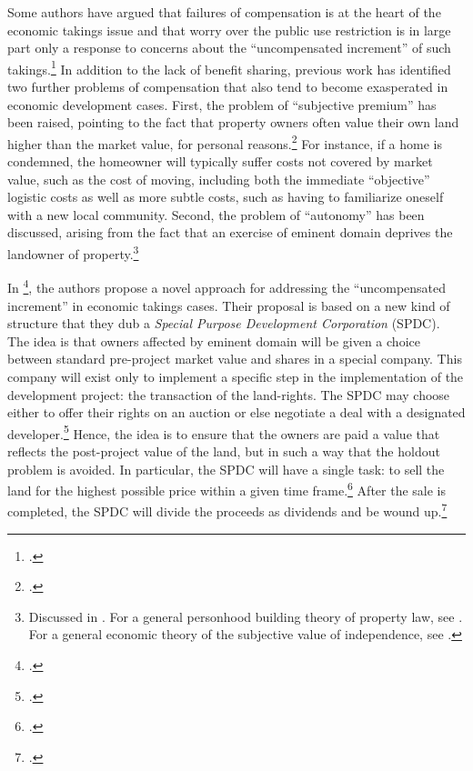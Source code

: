 {Some authors have argued that failures of compensation is at the heart of the economic takings issue and that worry over the public use restriction is in large part only a response to concerns about the ``uncompensated increment'' of such takings.\footcite[See][962]{fennell04} In addition to the lack of benefit sharing, previous work has identified two further problems of compensation that also tend to become exasperated in economic development cases. First, the problem of ``subjective premium'' has been raised, pointing to the fact that property owners often value their own land higher than the market value, for personal reasons.\footcite[963]{fennell04} For instance, if a home is condemned, the homeowner will typically suffer costs not covered by market value, such as the cost of moving, including both the immediate ``objective'' logistic costs as well as more subtle costs, such as having to familiarize oneself with a new local community. Second, the problem of ``autonomy'' has been discussed, arising from the fact that an exercise of eminent domain deprives the landowner of  property.\footnote{Discussed in \cite[966-967]{fennell04}. For a general personhood building theory of property law, see \cite{radin93}. For a general economic theory of the subjective value of independence, see \cite{benz08}.}

In \footcite{lehavi07}, the authors propose a novel approach for addressing the ``uncompensated increment'' in economic takings cases. Their proposal is based on a new kind of structure that they dub a {\it Special Purpose Development Corporation} (SPDC). The idea is that owners affected by eminent domain will be given a choice between standard pre-project market value and shares in a special company. This company will exist only to implement a specific step in the implementation of the development project: the transaction of the land-rights. The SPDC may choose either to offer their rights on an auction or else negotiate a deal with a designated developer.\footcite[1735]{lehavi07} Hence, the idea is to ensure that the owners are paid a value that reflects the post-project value of the land, but in such a way that the holdout problem is avoided. In particular, the SPDC will have a single task: to sell the land for the highest possible price within a given time frame.\footcite[1741]{lehavi07} After the sale is completed, the SPDC will divide the proceeds as dividends and be wound up.\footcite[1741]{lehavi07}

}
